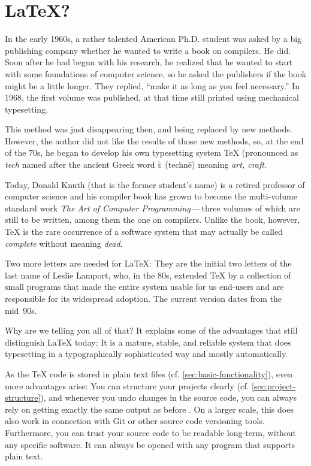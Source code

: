 \chapter{ \LaTeX?}
\label{sec:what-is-latex}

In the early 1960s, a rather talented American Ph.D. student was asked by a big publishing company whether he wanted to write a book on compilers.
He did.
Soon after he had begun with his research, he realized that he wanted to start with some foundations of computer science, so he asked the publishers if the book might be a little longer.
They replied, \enquote{make it as long as you feel necessary.}
In 1968, the first volume was published, at that time still printed using mechanical typesetting.

This method was just disappearing then, and being replaced by new methods.
However, the author did not like the results of those new methods, so,
at the end of the 70s, he began to develop his own typesetting system \TeX{}
(pronounced as \emph{tech} named after the ancient Greek word \texttau$\mathrm{\acute{\varepsilon}}$\textchi\textnu\texteta{} (technē) meaning \emph{art, craft}.

Today, Donald Knuth (that is the former student’s name) is a retired professor of computer science and his compiler book has grown to become the multi-volume standard work \emph{The Art of Computer Programming}\,—\,three volumes of which are still to be written, among them the one on compilers.
Unlike the book, however, \TeX{} is the rare occurrence of a software system that may actually be called \emph{complete} without meaning \emph{dead}.

Two more letters are needed for \LaTeX:
They are the initial two letters of the last name of Leslie Lamport, who, in the 80s, extended \TeX{} by a collection of small programs that made the entire system usable for us end-users and are responsible for its widespread adoption.
The current version dates from the mid~90s.

Why are we telling you all of that?
It explains some of the advantages that still distinguish \LaTeX{} today:
It is a mature, stable, and reliable system
that does typesetting in a typographically sophisticated way and mostly automatically.

As the \TeX{} code is stored in plain text files (cf. \cref{sec:basic-functionality}),
even more advantages arise:
You can structure your projects clearly (cf. \cref{sec:project-structure}),
and whenever you undo changes in the source code, you can always rely on getting exactly the same output as before
.
On a larger scale, this does also work in connection with Git or other source code versioning tools.
Furthermore, you can trust your source code to be readable long-term, without any specific software.
It can always be opened with any program that supports plain text.

